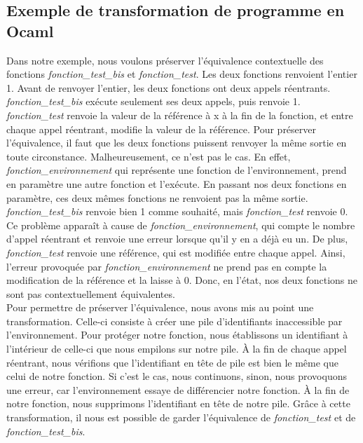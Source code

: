 \documentclass[11pt, a4paper, notitlepage]{article}
\newcommand\tab{{\hspace*{12.5mm}}}
\begin{document}
\subsection{Exemple de transformation de programme en Ocaml}
\tab Dans notre exemple, nous voulons préserver l'équivalence contextuelle des fonctions \textit{fonction\_test\_bis} et \textit{fonction\_test}. Les deux fonctions renvoient l'entier 1. Avant de renvoyer l'entier, les deux fonctions ont deux appels réentrants. \textit{fonction\_test\_bis} exécute seulement ses deux appels, puis renvoie 1.  \textit{fonction\_test} renvoie la valeur de la référence à x à la fin de la fonction, et entre chaque appel réentrant, modifie la valeur de la référence. Pour préserver l'équivalence, il faut que les deux fonctions puissent renvoyer la même sortie en toute circonstance. Malheureusement, ce n'est pas le cas. En effet, \textit{fonction\_environnement} qui représente une fonction de l'environnement, prend en paramètre une autre fonction et l'exécute. En passant nos deux fonctions en paramètre, ces deux mêmes fonctions ne renvoient pas la même sortie. \textit{fonction\_test\_bis} renvoie bien 1 comme souhaité, mais \textit{fonction\_test} renvoie 0. Ce problème apparaît à cause de \textit{fonction\_environnement}, qui compte le nombre d'appel réentrant et renvoie une erreur lorsque qu'il y en a déjà eu un. De plus, \textit{fonction\_test} renvoie une référence, qui est modifiée entre chaque appel. Ainsi, l'erreur provoquée par \textit{fonction\_environnement} ne prend pas en compte la modification de la référence et la laisse à 0. Donc, en l'état, nos deux fonctions ne sont pas contextuellement équivalentes. \\
\tab Pour permettre de préserver l'équivalence, nous avons mis au point une transformation. Celle-ci consiste à créer une pile d'identifiants inaccessible par l'environnement. Pour protéger notre fonction, nous établissons un identifiant à l'intérieur de celle-ci que nous empilons sur notre pile. À la fin de chaque appel réentrant, nous vérifions que l'identifiant en tête de pile est bien le même que celui de notre fonction. Si c'est le cas, nous continuons, sinon, nous provoquons une erreur, car l'environnement essaye de différencier notre fonction. À la fin de notre fonction, nous supprimons l'identifiant en tête de notre pile. Grâce à cette transformation, il nous est possible de garder l'équivalence de \textit{fonction\_test} et de \textit{fonction\_test\_bis}.\\
\end{document}
